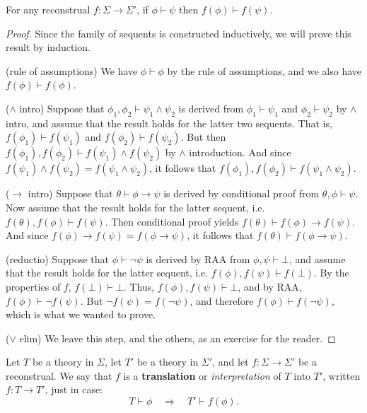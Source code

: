 \begin{subthm} For any reconstrual $f:\Sigma\to\Sigma '$, if
  $\phi\vdash\psi$ then $f(\phi )\vdash f(\psi )$. \end{subthm}

\begin{proof} Since the family of sequents is constructed inductively,
  we will prove this result by induction.

  \bigskip\noindent (rule of assumptions) We have $\phi\vdash \phi$ by
  the rule of assumptions, and we also have $f(\phi )\vdash f(\phi )$.

  \bigskip\noindent ($\wedge$ intro) Suppose that $\phi _1,\phi
  _2\vdash \psi _1\wedge \psi _2$ is derived from $\phi _1\vdash \psi
  _1$ and $\phi _2\vdash \psi _2$ by $\wedge$ intro, and assume that
  the result holds for the latter two sequents.  That is, $f(\phi
  _1)\vdash f(\psi _1)$ and $f(\phi _2)\vdash f(\psi _2)$.  But then
  $f(\phi _1),f(\phi _2)\vdash f(\psi _1)\wedge f(\psi _2)$ by
  $\wedge$ introduction.  And since $f(\psi _1)\wedge f(\psi
  _2)=f(\psi _1\wedge \psi _2)$, it follows that $f(\phi _1),f(\phi
  _2)\vdash f(\psi _1\wedge \psi _2)$.

  \bigskip\noindent ($\to$ intro) Suppose that $\theta \vdash \phi\to
  \psi$ is derived by conditional proof from $\theta ,\phi \vdash
  \psi$.  Now assume that the result holds for the latter sequent,
  i.e. $f(\theta ),f(\phi )\vdash f(\psi )$.  Then conditional proof
  yields $f(\theta )\vdash f(\phi )\to f(\psi )$.  And since $f(\phi
  )\to f(\psi )=f(\phi\to \psi )$, it follows that $f(\theta )\vdash
  f(\phi \to \psi )$.

  \bigskip\noindent (reductio) Suppose that $\phi\vdash\neg\psi$ is
  derived by RAA from $\phi ,\psi \vdash \bot$, and assume that the
  result holds for the latter sequent, i.e. $f(\phi ),f(\psi )\vdash
  f(\bot)$.  By the properties of $f$, $f(\bot )\vdash \bot$.  Thus,
  $f(\phi ),f(\psi )\vdash \bot$, and by RAA, $f(\phi )\vdash \neg
  f(\psi )$.  But $\neg f(\psi )=f(\neg \psi )$, and therefore $f(\phi
  )\vdash f(\neg \psi )$, which is what we wanted to prove.

  \bigskip\noindent ($\vee$ elim) We leave this step, and the others,
  as an exercise for the reader.
\end{proof}

\begin{defn} Let $T$ be a theory in $\Sigma$, let $T'$ be a theory in
  $\Sigma '$, and let $f:\Sigma\to\Sigma '$ be a reconstrual.  We say
  that $f$ is a \textbf{translation} or \emph{interpretation} of $T$
  into $T'$, written $f:T\to T'$, just in case:
  \[ T\vdash \phi \quad \Longrightarrow \quad T'\vdash f(\phi )
    .\] \end{defn}

